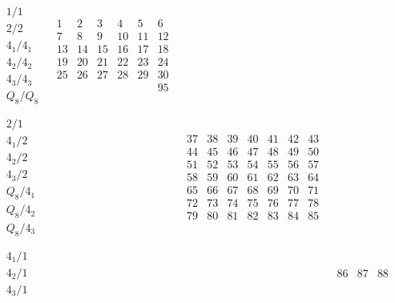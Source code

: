 \documentclass[11pt,a4paper]{amsart}
\begin{document}
\begin{align*}
  \begin{array}{r||c|c|c|c|c}
    \begin{array}{r}
      1/1 \\
      2/2 \\
      4_1/4_1 \\
      4_2/4_2 \\
      4_3/4_3 \\
      Q_8/Q_8 \\
    \end{array}
&
  \begin{array}{cccccc}
1&2&3&4&5&6\\
7&8&9&10&11&12\\
13&14&15&16&17&18\\
19&20&21&22&23&24\\
25&26&27&28&29&30\\
&&&&&95\\
  \end{array}
&&&& \\ \hline
    \begin{array}{r}
      2/1 \\
      4_1/2 \\
      4_2/2 \\
      4_3/2 \\
      Q_8/4_1 \\
      Q_8/4_2 \\
      Q_8/4_3 \\
    \end{array}
&&
   \begin{array}{cccccccc}
37&38&39&40&41&42&43\\
44&45&46&47&48&49&50\\
51&52&53&54&55&56&57\\
58&59&60&61&62&63&64\\
65&66&67&68&69&70&71\\
72&73&74&75&76&77&78\\
79&80&81&82&83&84&85\\
   \end{array}
&&& \\ \hline
    \begin{array}{r}
      4_1/1 \\
      4_2/1 \\
      4_3/1 \\
    \end{array}
&&&
    \begin{array}{ccc}
      86&87&88\\

\end{array}
\end{array}
\end{align*}
\end{document}
